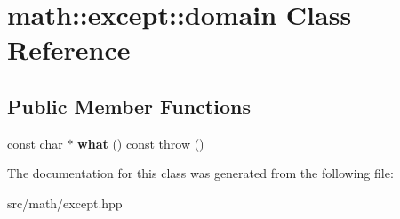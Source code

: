 \hypertarget{classmath_1_1except_1_1domain}{
\section{math::except::domain Class Reference}
\label{classmath_1_1except_1_1domain}
}
\subsection*{Public Member Functions}
\begin{DoxyCompactItemize}
\item 
\hypertarget{classmath_1_1except_1_1domain_adb97a428e44d728735fdf1e8c203dd1b}{
const char $\ast$ {\bfseries what} () const   throw ()}
\label{classmath_1_1except_1_1domain_adb97a428e44d728735fdf1e8c203dd1b}

\end{DoxyCompactItemize}


The documentation for this class was generated from the following file:\begin{DoxyCompactItemize}
\item 
src/math/except.hpp\end{DoxyCompactItemize}
